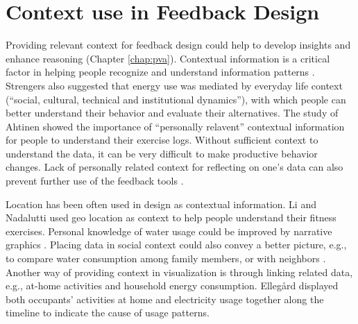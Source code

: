 \documentclass[12pt,oneside]{book}
\begin{document}
\section{Context use in Feedback Design} 
\label{section:relatedWork:feedback design:context and ongoing use}
Providing relevant context for feedback design could help to develop insights and enhance reasoning (Chapter \ref{chap:pva}). Contextual information is a critical factor in helping people recognize and understand information patterns \cite{bartram_design_2015,dembo_system_2013,strengers_designing_2011}.  Strengers \cite{strengers_designing_2011} also suggested that energy use was mediated by everyday life context (``social, cultural, technical and institutional dynamics''), with which people can better understand their behavior and evaluate their alternatives.  The study of Ahtinen \cite{ahtinen_user_2009} showed the importance of ``personally relavent'' contextual information for people to understand their exercise logs.  Without sufficient context to understand the data, it can be very difficult to make productive behavior changes. Lack of personally related context for reflecting on one's data can also prevent further use of the feedback tools \cite{kim_design_2016}.

Location has been often used in design as contextual information. Li \cite{li_using_2012} and Nadalutti \cite{nadalutti_visual_2007} used geo location as context to help people understand their fitness exercises.  Personal knowledge of water usage could be improved by narrative graphics \cite{froehlich_design_2012}.  Placing data in social context could also convey a better picture, e.g., to compare water consumption among family members\cite{froehlich_design_2012}, or with neighbors \cite{erickson_dubuque_2012}.  Another way of providing context in visualization is through linking related data, e.g., at-home activities and household energy consumption.  Elleg\r{a}rd \cite{ellegard_visualizing_2011} displayed both occupants' activities at home and electricity usage together along the timeline to indicate the cause of usage patterns. 
\end{document}
